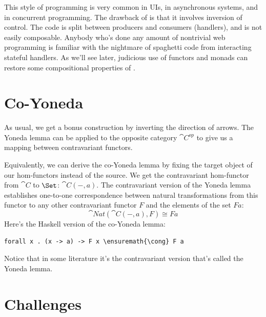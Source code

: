 This style of programming is very common in UIs, in asynchronous
systems, and in concurrent programming. The drawback of  is that it
involves inversion of control. The code is split between producers and
consumers (handlers), and is not easily composable. Anybody who's done
any amount of nontrivial web programming is familiar with the nightmare
of spaghetti code from interacting stateful handlers. As we'll see
later, judicious use of functors and monads can restore some
compositional properties of .

\section{Co-Yoneda}

As usual, we get a bonus construction by inverting the direction of
arrows. The Yoneda lemma can be applied to the opposite category
$\cat{C}^{op}$ to give us a mapping between contravariant
functors.

Equivalently, we can derive the co-Yoneda lemma by fixing the target
object of our hom-functors instead of the source. We get the
contravariant hom-functor from $\cat{C}$ to $\Set$:
$\cat{C}(-, a)$. The contravariant version of the Yoneda lemma
establishes one-to-one correspondence between natural transformations
from this functor to any other contravariant functor $F$ and the
elements of the set $F a$:
\[\cat{Nat}(\cat{C}(-, a), F) \cong F a\]
Here's the Haskell version of the co-Yoneda lemma:

\begin{Verbatim}[commandchars=\\\{\}]
forall x . (x -> a) -> F x \ensuremath{\cong} F a
\end{Verbatim}
Notice that in some literature it's the contravariant version that's
called the Yoneda lemma.

\section{Challenges}

